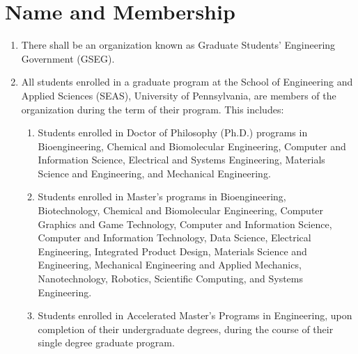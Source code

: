 \chapter{Name and Membership}

\begin{enumerate}[label=\Alph*.]
	\item There shall be an organization known as Graduate Students'
	Engineering Government (GSEG).

	\item All students enrolled in a graduate program at the School
	of Engineering and Applied Sciences (SEAS), University of
	Pennsylvania, are members of the organization during the term of
	their program. This includes: 

	\begin{enumerate}[label=(\roman*)]
		\item Students enrolled in Doctor of Philosophy (Ph.D.)
		programs in Bioengineering, Chemical and Biomolecular
		Engineering, Computer and Information Science, Electrical and
		Systems Engineering, Materials Science and Engineering, and
		Mechanical Engineering.
		\item Students enrolled in Master's programs in
		Bioengineering, \\ Biotechnology, Chemical and Biomolecular
		Engineering, Computer Graphics and Game Technology, Computer
		and Information Science, Computer and Information Technology,
		Data Science, Electrical Engineering, Integrated Product
		Design, Materials Science and Engineering, Mechanical
		Engineering and Applied Mechanics, Nanotechnology, Robotics,
		Scientific Computing, and Systems Engineering.
		\item Students enrolled in Accelerated Master's Programs in
		Engineering, upon completion of their undergraduate degrees,
		during the course of their single degree graduate program.
	\end{enumerate}
\end{enumerate}
